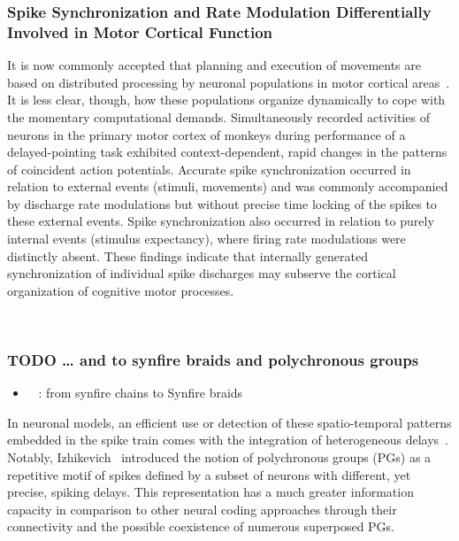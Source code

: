 \documentclass[brainsci, %
               review,submit,pdftex,moreauthors]{Definitions/mdpi}
\begin{document}
\subsubsection{Spike Synchronization and Rate Modulation Differentially Involved in Motor Cortical Function~\citep{riehle_spike_1997}}\label{spike-synchronization-and-rate-modulation-differentially-involved-in-motor-cortical-function-doi10.1126science.278.5345.1950}
It is now commonly accepted that planning and execution of movements are based on distributed processing by neuronal populations in motor cortical areas~\citep{grammont_precise_1999}. It is less clear, though, how these populations organize dynamically to cope with the momentary computational demands. Simultaneously recorded activities of neurons in the primary motor cortex of monkeys during performance of a delayed-pointing task exhibited context-dependent, rapid changes in the patterns of coincident action potentials. Accurate spike synchronization occurred in relation to external events (stimuli, movements) and was commonly accompanied by discharge rate modulations but without precise time locking of the spikes to these external events. Spike synchronization also occurred in relation to purely internal events (stimulus expectancy), where firing rate modulations were distinctly absent. These findings indicate that internally generated synchronization of individual spike discharges may subserve the cortical organization of cognitive motor processes.

~\citep{chemla_suppressive_2019}

\subsubsection{TODO \ldots{} and to synfire braids and polychronous groups}\label{todo-and-to-synfire-braids-and-polychronous-groups}
\begin{itemize}
 \item
 ~\citep{bienenstock_model_1995} : from synfire chains to Synfire braids
\end{itemize}

In neuronal models, an efficient use or detection of these spatio-temporal patterns embedded in the spike train comes with the integration of heterogeneous delays~\citep{guise_bayesian_2014,zhang_supervised_2020}. Notably, Izhikevich~\citep{izhikevich_polychronization_2006} introduced the notion of polychronous groups (PGs) as a repetitive motif of spikes defined by a subset of neurons with different, yet precise, spiking delays. This representation has a much greater information capacity in comparison to other neural coding approaches through their connectivity and the possible coexistence of numerous superposed PGs.
\end{document}
